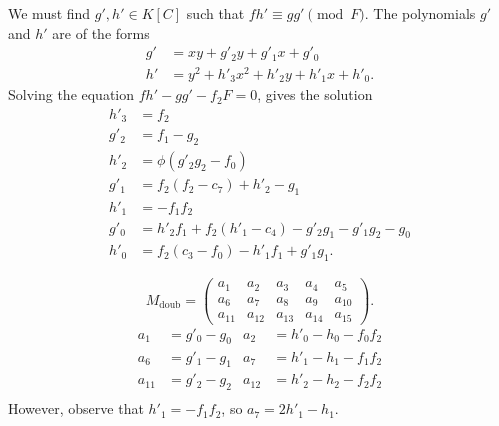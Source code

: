 We must find $g', h' \in K[C]$ such that $fh' \equiv gg' \pmod F$.
The polynomials $g'$ and $h'$ are of the forms
\begin{align*}
  g' &= xy            + g'_2y + g'_1x + g'_0 \\
  h' &= y^2 + h'_3x^2 + h'_2y + h'_1x + h'_0.
\end{align*}
Solving the equation $fh' - gg' - f_2F = 0$, gives the solution
\begin{align*}
  h'_3 &= f_2 \\
  g'_2 &= f_1 - g_2 \\
  h'_2 &= \phi(g'_2g_2 - f_0) \\ 
  g'_1 &= f_2(f_2 - c_7) + h'_2 - g_1 \\
  h'_1 &= -f_1f_2 \\
  g'_0 &= h'_2f_1 + f_2(h'_1 - c_4) - g'_2g_1 - g'_1g_2 - g_0 \\
  h'_0 &= f_2(c_3 - f_0) - h'_1f_1 + g'_1g_1.
\end{align*}
\begin{comment}
\begin{align*}
  h'_3 &= f_2 \\
  g'_2 &= - c_8f_2 + f_1 - g_2 \\
  h'_2 &= c_5 + \phi(g'_2g_2 - f_0) \\ 
  g'_1 &= f_2(f_2 - c_7) + h'_2 - g_1 \\
  h'_1 &= f_2(c_6 - f_1) \\
  g'_0 &= h'_2f_1 + f_2(h'_1 - c_4) - g'_2g_1 - g'_1g_2 - g_0 \\
  h'_0 &= f_2(c_3 - f_0) - h'_1f_1 + g'_1g_1.
\end{align*}
\end{comment}
\[ M_{\text{doub}} =
\begin{pmatrix}
  a_1 & a_2 & a_3 & a_4 & a_5 \\
  a_6 & a_7 & a_8 & a_9 & a_{10} \\
  a_{11} & a_{12} & a_{13} & a_{14} & a_{15}
\end{pmatrix}. \]
\begin{align*}
  a_1    &= g'_0 - g_0 & a_2    &= h'_0 - h_0 - f_0f_2 \\
  a_6    &= g'_1 - g_1 & a_7    &= h'_1 - h_1 - f_1f_2 \\
  a_{11} &= g'_2 - g_2 & a_{12} &= h'_2 - h_2 - f_2f_2 \\
\end{align*}
However, observe that $h'_1 = -f_1f_2$, so $a_7 = 2h'_1 - h_1$.
